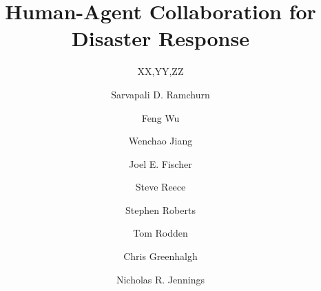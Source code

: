 \documentclass{svjour3}                     %
\begin{document}


\title{Human-Agent Collaboration for Disaster Response}




%
%
%
%

%

%
\author{XX,YY,ZZ}
\author{Sarvapali D. Ramchurn \and Feng Wu \and Wenchao Jiang \and Joel E. Fischer \and Steve Reece \and Stephen Roberts \and Tom Rodden \and Chris Greenhalgh \and  Nicholas R. Jennings
}

%
\end{document}
